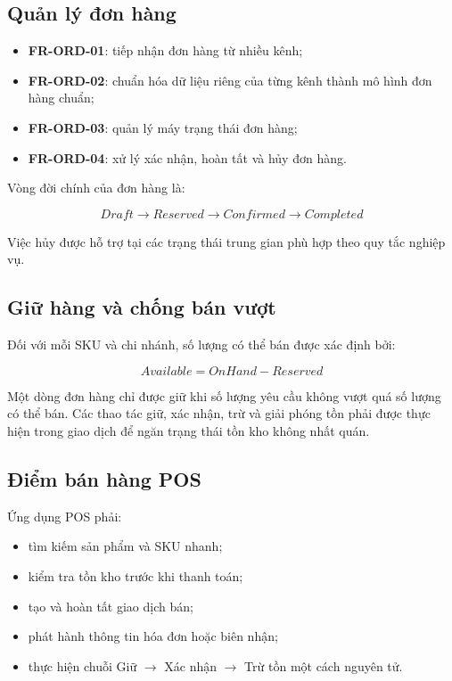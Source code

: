 \subsection{Quản lý đơn hàng}

\begin{itemize}
    \item \textbf{FR-ORD-01}: tiếp nhận đơn hàng từ nhiều kênh;
    \item \textbf{FR-ORD-02}: chuẩn hóa dữ liệu riêng của từng kênh thành mô hình đơn hàng chuẩn;
    \item \textbf{FR-ORD-03}: quản lý máy trạng thái đơn hàng;
    \item \textbf{FR-ORD-04}: xử lý xác nhận, hoàn tất và hủy đơn hàng.
\end{itemize}

Vòng đời chính của đơn hàng là:

\[
Draft \rightarrow Reserved \rightarrow Confirmed \rightarrow Completed
\]

Việc hủy được hỗ trợ tại các trạng thái trung gian phù hợp theo quy tắc nghiệp vụ.

\subsection{Giữ hàng và chống bán vượt}

Đối với mỗi SKU và chi nhánh, số lượng có thể bán được xác định bởi:

\[
Available = OnHand - Reserved
\]

Một dòng đơn hàng chỉ được giữ khi số lượng yêu cầu không vượt quá số lượng có thể bán.
Các thao tác giữ, xác nhận, trừ và giải phóng tồn phải được thực hiện trong giao dịch để
ngăn trạng thái tồn kho không nhất quán.

\subsection{Điểm bán hàng POS}

Ứng dụng POS phải:

\begin{itemize}
    \item tìm kiếm sản phẩm và SKU nhanh;
    \item kiểm tra tồn kho trước khi thanh toán;
    \item tạo và hoàn tất giao dịch bán;
    \item phát hành thông tin hóa đơn hoặc biên nhận;
    \item thực hiện chuỗi Giữ $\rightarrow$ Xác nhận $\rightarrow$ Trừ tồn một cách nguyên tử.
\end{itemize}

